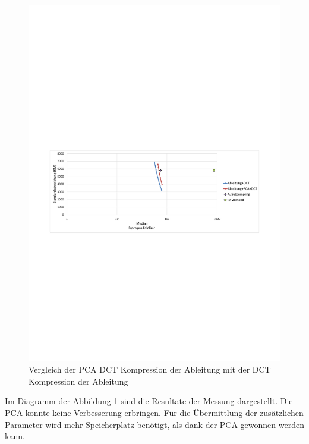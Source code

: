 \begin{figure}[!htbp]
	\center
	\includegraphics[trim = 1.8cm 11.25cm 1.8cm 12.75cm, clip=true,width=1\textwidth,keepaspectratio]{./pictures/resultate/loesung1/loesung1-4/loesung1_4.pdf}
	\caption{Vergleich der PCA DCT Kompression der Ableitung mit der DCT Kompression der Ableitung}
	\label{resultate:loesung1:dct:pca}
\end{figure}
Im Diagramm der Abbildung \ref{resultate:loesung1:dct:pca} sind die Resultate der Messung dargestellt. Die PCA konnte keine Verbesserung erbringen. Für die Übermittlung der zusätzlichen Parameter wird mehr Speicherplatz benötigt, als dank der PCA gewonnen werden kann.


